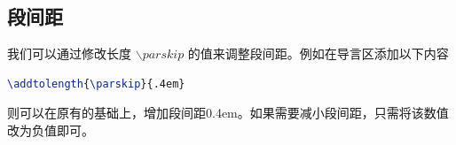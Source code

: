 \subsection{段间距}
我们可以通过修改长度 $\backslash parskip$ 的值来调整段间距。例如在导言区添加以下内容

\begin{lstlisting}[language={TeX}]
    \addtolength{\parskip}{.4em}
\end{lstlisting}

则可以在原有的基础上，增加段间距0.4em。如果需要减小段间距，只需将该数值改为负值即可。

\clearpage
{}
{} %
